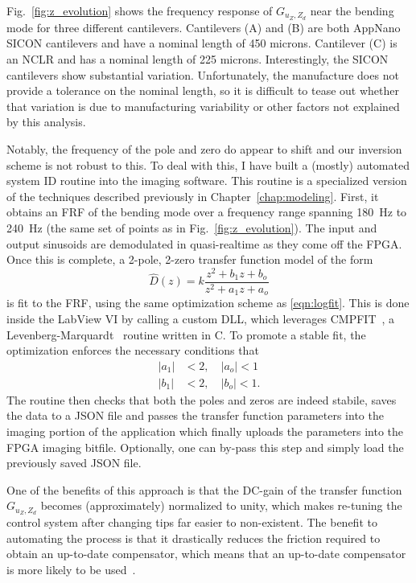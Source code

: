 \documentclass[twocolumn,twoside]{IEEEtran/IEEEtran}
\begin{document}
Fig.~\ref{fig:z_evolution} shows the frequency response of $G_{u_Z,Z_d}$ near
the bending mode for three different cantilevers. Cantilevers (A) and (B) are
both AppNano SICON cantilevers and have a nominal length of 450 microns.
Cantilever (C) is an NCLR and has a nominal length of 225 microns.
Interestingly, the SICON cantilevers show substantial variation. Unfortunately,
the manufacture does not provide a tolerance on the nominal length, so it is
difficult to tease out whether that variation is due to manufacturing
variability or other factors not explained by this analysis.

Notably, the frequency of the pole and zero do appear to shift and our inversion
scheme is not robust to this. To deal with this, I have built a (mostly)
automated system ID routine into the imaging software. This routine is a
specialized version of the techniques described previously in
Chapter~\ref{chap:modeling}. First, it obtains an FRF of the bending mode over a
frequency range spanning 180~Hz to 240~Hz (the same set of points as in
Fig.~\ref{fig:z_evolution}). The input and output sinusoids are demodulated in
quasi-realtime as they come off the FPGA. Once this is complete, a 2-pole,
2-zero transfer function model of the form
\begin{equation*}
  \hat{D}(z) = k \frac{z^2 + b_1z + b_o}{z^2 + a_1z + a_o}
\end{equation*}
is fit to the FRF, using the same optimization scheme as \eqref{eqn:logfit}.
This is done inside the LabView VI by calling a custom DLL, which leverages
CMPFIT~\cite{cmpfit,markwardt_mpfit_2009}, a
Levenberg-Marquardt~\cite{more_levenberg_1978} routine written in C. To promote
a stable fit, the optimization enforces the necessary conditions that
\begin{align*}
  |a_1| &< 2, \quad  |a_o| < 1\\
  |b_1| &< 2, \quad  |b_o| < 1.
\end{align*}
The routine then checks that both the poles and zeros are indeed stabile, saves
the data to a JSON file and passes the transfer function parameters into the
imaging portion of the application which finally uploads the parameters into the
FPGA imaging bitfile. Optionally, one can by-pass this step and simply load the
previously saved JSON file.

One of the benefits of this approach is that the DC-gain of the transfer
function $G_{u_Z,Z_d}$ becomes (approximately) normalized to unity, which makes
re-tuning the control system after changing tips far easier to non-existent. The
benefit to automating the process is that it drastically reduces the friction
required to obtain an up-to-date compensator, which means that an up-to-date
compensator is more likely to be used~\cite{abramovitch_25years_2015}.
\end{document}
